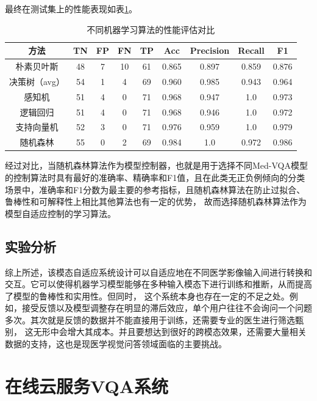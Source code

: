 最终在测试集上的性能表现如表\ref{tab:ML_compare}。
\begin{table}
	\caption{\label{tab:ML_compare}不同机器学习算法的性能评估对比}
	\centering
	\small
	\begin{tabular}{c|cccccccc}
		\hline  方法 & TN & FP & FN & TP & Acc & Precision & Recall & F1 \\
		\hline 朴素贝叶斯 & 48 & 7 & 10 & 61 & 0.865 & 0.897 & 0.859 & 0.876 \\
        决策树（avg） & 54 & 1 & 4 & 69 & 0.960 & 0.985 & 0.943 & 0.964 \\
        感知机 & 51 & 4 & 0 & 71 & 0.968 & 0.947 & 1.0 & 0.973 \\
        逻辑回归 & 51 & 4 & 0 & 71 & 0.968 & 0.946 & 1.0 & 0.972 \\
		支持向量机 & 52 & 3 & 0 & 71 & 0.976 & 0.959 & 1.0 & 0.979 \\
        随机森林 & 55 & 0 & 2 & 69 & 0.984 & 1.0 & 0.972 & 0.986 \\
		\hline
		\end{tabular}
\end{table}
经过对比，当随机森林算法作为模型控制器，也就是用于选择不同Med-VQA模型的控制算法时具有最好的准确率、精确率和F1值，且在此类无正负例倾向的分类场景中，准确率和F1分数为最主要的参考指标，且随机森林算法在防止过拟合、鲁棒性和可解释性上相比其他算法也有一定的优势，
故而选择随机森林算法作为模型自适应控制的学习算法。

\subsection{实验分析}
综上所述，该模态自适应系统设计可以自适应地在不同医学影像输入间进行转换和交互。它可以使得机器学习模型能够在多种输入模态下进行训练和推断，从而提高了模型的鲁棒性和实用性。但同时，
这个系统本身也存在一定的不足之处。例如，接受反馈以及模型调整存在明显的滞后效应，单个用户往往不会询问一个问题多次。其次就是反馈的数据并不能直接用于训练，还需要专业的医生进行筛选甄别，
这无形中会增大其成本。并且要想达到很好的跨模态效果，还需要大量相关数据的支持，这也是现医学视觉问答领域面临的主要挑战。

\section{在线云服务VQA系统}

